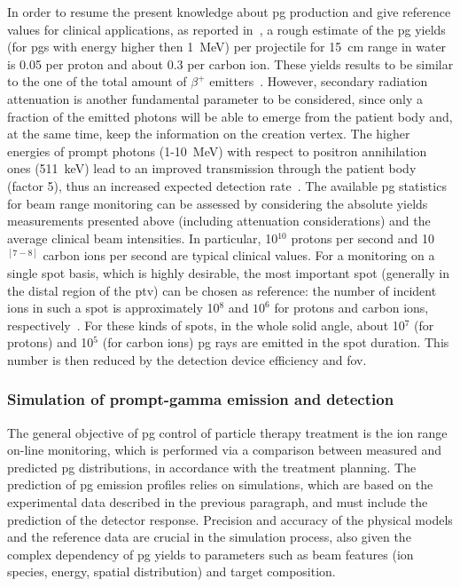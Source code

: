 In order to resume the present knowledge about \gls{pg} production and give reference values for clinical applications, as reported in~\cite{Krimmer2017}, a rough estimate of the \gls{pg} yields (for \glspl{pg} with energy higher then 1~MeV) per projectile for 15~cm range in water is 0.05 per proton and about 0.3 per carbon ion. These yields results to be similar to the one of the total amount of $\beta^{+}$ emitters~\parencite{Pinto2015, Robert2013}. However, secondary radiation attenuation is another fundamental parameter to be considered, since only a fraction of the emitted photons will be able to emerge from the patient body and, at the same time, keep the information on the creation vertex. The higher energies of prompt photons (1-10~MeV) with respect to positron annihilation ones (511~keV) lead to an improved transmission through the patient body (factor 5), thus an increased expected detection rate~\parencite{Moteabbed2011}. 
The available \gls{pg} statistics for beam range monitoring can be assessed by considering the absolute yields measurements presented above (including attenuation considerations) and the average clinical beam intensities. In particular, 10$^{10}$ protons per second and 10$^{[7-8]}$ carbon ions per second are typical clinical values. For a monitoring on a single spot basis, which is highly desirable, the most important spot (generally in the distal region of the \gls{ptv}) can be chosen as reference: the number of incident ions in such a spot is approximately 10$^8$ and $10^6$ for protons and carbon ions, respectively~\parencite{Kramer2000, Grevillot2012}. For these kinds of spots, in the whole solid angle, about 10$^7$ (for protons) and 10$^5$ (for carbon ions) \gls{pg} rays are emitted in the spot duration. This number is then reduced by the detection device efficiency and \gls{fov}. 

\subsubsection{Simulation of prompt-gamma emission and detection}\label{chap2::subsec::PGsimulation}

The general objective of \gls{pg} control of particle therapy treatment is the ion range on-line monitoring, which is performed via a comparison between measured and predicted \gls{pg} distributions, in accordance with the treatment planning. The prediction of \gls{pg} emission profiles relies on simulations, which are based on the experimental data described in the previous paragraph, and must include the prediction of the detector response. Precision and accuracy of the physical models and the reference data are crucial in the simulation process, also given the complex dependency of \gls{pg} yields to parameters such as beam features (ion species, energy, spatial distribution) and target composition. 

